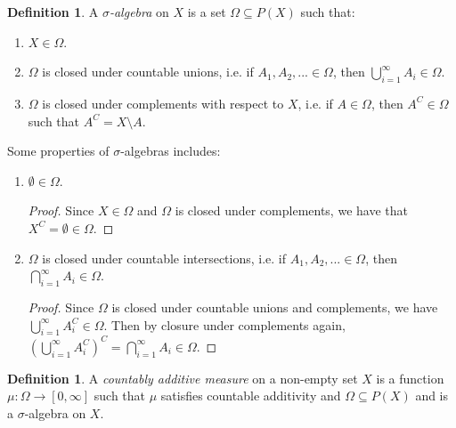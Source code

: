 \documentclass[letterpaper, 11pt]{article}
\newcommand{\1}{\mathds{1}}		%
\theoremstyle{definition}
\newtheorem{definition}[theorem]{Definition}
\begin{document}
\begin{definition}
    A \textit{$\sigma$-algebra} on $X$ is a set $\Omega \subseteq P(X)$ such that:
    \begin{enumerate}
        \item $X \in \Omega$.
        \item $\Omega$ is closed under countable unions, i.e. if $A_1, A_2, ... \in \Omega$, then $\bigcup_{i=1}^{\infty} A_i \in \Omega$.
        \item $\Omega$ is closed under complements with respect to $X$, i.e. if $A \in \Omega$, then $A^C \in \Omega$ such that $A^C = X \setminus A$.
    \end{enumerate}
    Some properties of $\sigma$-algebras includes:
    \begin{enumerate}
        \item $\emptyset \in \Omega$.
        \begin{proof}
            Since $X \in \Omega$ and $\Omega$ is closed under complements, we have that $X^C = \emptyset \in \Omega$.
        \end{proof}
        \item $\Omega$ is closed under countable intersections, i.e. if $A_1, A_2, ... \in \Omega$, then $\bigcap_{i=1}^{\infty} A_i \in \Omega$.
        \begin{proof}
            Since $\Omega$ is closed under countable unions and complements, we have $\bigcup_{i=1}^{\infty} A_i^C \in \Omega$. Then by closure under complements again, $(\bigcup_{i=1}^{\infty} A_i^C)^C = \bigcap_{i=1}^{\infty} A_i \in \Omega$.
        \end{proof}
    \end{enumerate}
\end{definition}

\begin{definition}
    A \textit{countably additive measure} on a non-empty set $X$ is a function $\mu : \Omega \to [0, \infty]$ such that $\mu$ satisfies countable additivity and $\Omega \subseteq P(X)$ and is a $\sigma$-algebra on $X$.
\end{definition}
\end{document}
